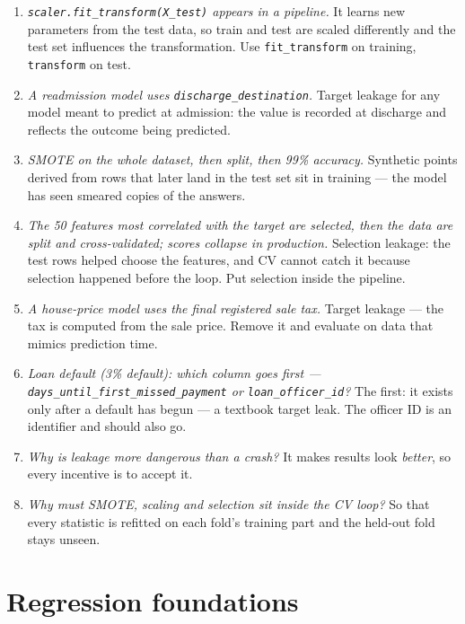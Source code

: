 \documentclass[11pt]{article}
\newcommand{\unit}[1]{\par\medskip\noindent{\large\bfseries\color{UPESPurple}#1}\par\smallskip}
\begin{document}
\begin{concept}
\begin{enumerate}[label=\textbf{C16.\arabic*}]
  \item \emph{\texttt{scaler.fit\_transform(X\_test)} appears in a pipeline.}
    It learns new parameters from the test data, so train and test are scaled
    differently and the test set influences the transformation. Use
    \texttt{fit\_transform} on training, \texttt{transform} on test.
  \item \emph{A readmission model uses \texttt{discharge\_destination}.} Target
    leakage for any model meant to predict at admission: the value is recorded
    at discharge and reflects the outcome being predicted.
  \item \emph{SMOTE on the whole dataset, then split, then 99\% accuracy.}
    Synthetic points derived from rows that later land in the test set sit in
    training --- the model has seen smeared copies of the answers.
  \item \emph{The 50 features most correlated with the target are selected,
    then the data are split and cross-validated; scores collapse in
    production.} Selection leakage: the test rows helped choose the features,
    and CV cannot catch it because selection happened before the loop. Put
    selection inside the pipeline.
  \item \emph{A house-price model uses the final registered sale tax.} Target
    leakage --- the tax is computed from the sale price. Remove it and
    evaluate on data that mimics prediction time.
  \item \emph{Loan default (3\% default): which column goes first ---
    \texttt{days\_until\_first\_missed\_payment} or
    \texttt{loan\_officer\_id}?} The first: it exists only after a default
    has begun --- a textbook target leak. The officer ID is an identifier and
    should also go.
  \item \emph{Why is leakage more dangerous than a crash?} It makes results
    look \emph{better}, so every incentive is to accept it.
  \item \emph{Why must SMOTE, scaling and selection sit inside the CV loop?}
    So that every statistic is refitted on each fold's training part and the
    held-out fold stays unseen.
\end{enumerate}
\end{concept}
\unit{Unit V --- Regression (L8--L9)}
\section{Regression foundations}
\label{sec:regfound}
\end{document}
